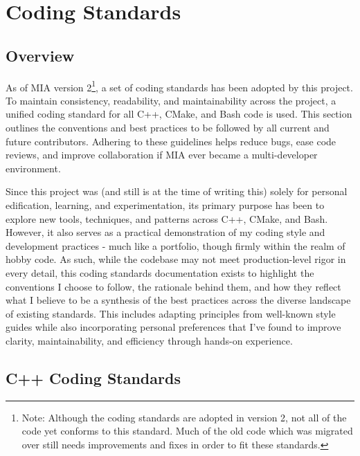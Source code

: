 \chapter{Coding Standards}

\section{Overview}

As of MIA version 2\footnote{Note: Although the coding standards are adopted in version 2, not all of the code yet conforms to this standard. Much of the old code which was migrated over still needs improvements and fixes in order to fit these standards.}, a set of coding standards has been adopted by this project. To maintain consistency, readability, and maintainability across the project, a unified coding standard for all C++, CMake, and Bash code is used. This section outlines the conventions and best practices to be followed by all current and future contributors. Adhering to these guidelines helps reduce bugs, ease code reviews, and improve collaboration if MIA ever became a multi-developer environment.

Since this project was (and still is at the time of writing this) solely for personal edification, learning, and experimentation, its primary purpose has been to explore new tools, techniques, and patterns across C++, CMake, and Bash. However, it also serves as a practical demonstration of my coding style and development practices - much like a portfolio, though firmly within the realm of hobby code. As such, while the codebase may not meet production-level rigor in every detail, this coding standards documentation exists to highlight the conventions I choose to follow, the rationale behind them, and how they reflect what I believe to be a synthesis of the best practices across the diverse landscape of existing standards. This includes adapting principles from well-known style guides while also incorporating personal preferences that I’ve found to improve clarity, maintainability, and efficiency through hands-on experience.

\section{C++ Coding Standards}

